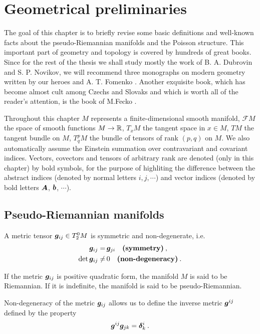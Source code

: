 \chapter{Geometrical preliminaries}

The goal of this chapter is to briefly revise some basic definitions and well-known facts about the pseudo-Riemannian manifolds and the Poisson structure. This important part of geometry and topology is covered by hundreds of great books. Since for the rest of the thesis we shall study mostly the work of B. A. Dubrovin and S. P. Novikov, we will recommend three monographs on modern geometry written by our heroes and A. T. Fomenko \cite{DN-Geometry1}. Another exquisite book, which has become almost cult among Czechs and Slovaks and which is worth all of the reader's attention, is the book of M.Fecko \cite{Fecko}.

Throughout this chapter $M$ represents a finite-dimensional smooth manifold, $\mathcal F M$ the space of smooth functions $M \to \mathbb{R}$, $T_x M$ the tangent space in $x \in M$, $T M$ the tangent bundle on $M$, $T^p_q M$ the bundle of tensors of rank $(p,q)$ on $M$. We also automatically assume the Einstein summation over contravariant and covariant indices. Vectors, covectors and tensors of arbitrary rank are denoted (only in this chapter) by bold symbols, for the purpose of highliting the difference between the abstract indices (denoted by normal letters $i,j,\cdots$) and vector indices (denoted by bold letters $\boldsymbol{A}$, $\boldsymbol{b}$, $\cdots$).

\section{Pseudo-Riemannian manifolds}

\begin{definition}
    A metric tensor $\boldsymbol{g}_{ij} \in T^0_2 M$ is symmetric and non-degenerate, i.e.
    \begin{align}
        \boldsymbol{g}_{ij} =&\, \boldsymbol{g}_{ji} \quad \textbf{(symmetry)}\:, \\ \det \boldsymbol{g}_{ij} \neq&\, 0 \quad \textbf{(non-degeneracy)}\:.
    \end{align}
\end{definition}

If the metric $\boldsymbol{g}_{ij}$ is positive quadratic form, the manifold $M$ is said to be Riemannian. If it is indefinite, the manifold is said to be pseudo-Riemannian.

Non-degeneracy of the metric $\boldsymbol{g}_{ij}$ allows us to define the inverse metric $\boldsymbol{g}^{ij}$ defined by the property
\begin{align}
    \boldsymbol{g}^{ij} \boldsymbol{g}_{jk} = \boldsymbol{\delta}^i_k \:.
\end{align}

